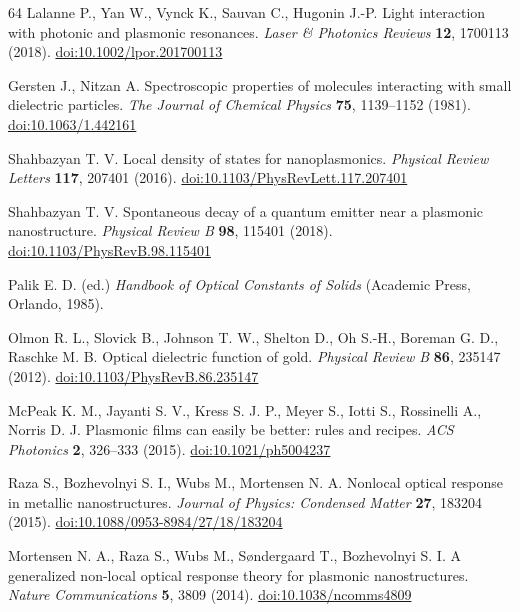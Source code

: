 \begin{thebibliography}{64}
 Lalanne P., Yan W., Vynck K., Sauvan C., Hugonin J.-P. Light interaction with photonic and plasmonic resonances. \textit{Laser \& Photonics Reviews} \textbf{12}, 1700113 (2018). \href{https://doi.org/10.1002/lpor.201700113}{doi:10.1002/lpor.201700113}

 Gersten J., Nitzan A. Spectroscopic properties of molecules interacting with small dielectric particles. \textit{The Journal of Chemical Physics} \textbf{75}, 1139--1152 (1981). \href{https://doi.org/10.1063/1.442161}{doi:10.1063/1.442161}

 Shahbazyan T. V. Local density of states for nanoplasmonics. \textit{Physical Review Letters} \textbf{117}, 207401 (2016). \href{https://doi.org/10.1103/PhysRevLett.117.207401}{doi:10.1103/PhysRevLett.117.207401}

 Shahbazyan T. V. Spontaneous decay of a quantum emitter near a plasmonic nanostructure. \textit{Physical Review B} \textbf{98}, 115401 (2018). \href{https://doi.org/10.1103/PhysRevB.98.115401}{doi:10.1103/PhysRevB.98.115401}

 Palik E. D. (ed.) \textit{Handbook of Optical Constants of Solids} (Academic Press, Orlando, 1985).

 Olmon R. L., Slovick B., Johnson T. W., Shelton D., Oh S.-H., Boreman G. D., Raschke M. B. Optical dielectric function of gold. \textit{Physical Review B} \textbf{86}, 235147 (2012). \href{https://doi.org/10.1103/PhysRevB.86.235147}{doi:10.1103/PhysRevB.86.235147}

 McPeak K. M., Jayanti S. V., Kress S. J. P., Meyer S., Iotti S., Rossinelli A., Norris D. J. Plasmonic films can easily be better: rules and recipes. \textit{ACS Photonics} \textbf{2}, 326--333 (2015). \href{https://doi.org/10.1021/ph5004237}{doi:10.1021/ph5004237}

 Raza S., Bozhevolnyi S. I., Wubs M., Mortensen N. A. Nonlocal optical response in metallic nanostructures. \textit{Journal of Physics: Condensed Matter} \textbf{27}, 183204 (2015). \href{https://doi.org/10.1088/0953-8984/27/18/183204}{doi:10.1088/0953-8984/27/18/183204}

 Mortensen N. A., Raza S., Wubs M., Søndergaard T., Bozhevolnyi S. I. A generalized non-local optical response theory for plasmonic nanostructures. \textit{Nature Communications} \textbf{5}, 3809 (2014). \href{https://doi.org/10.1038/ncomms4809}{doi:10.1038/ncomms4809}


\end{thebibliography}
